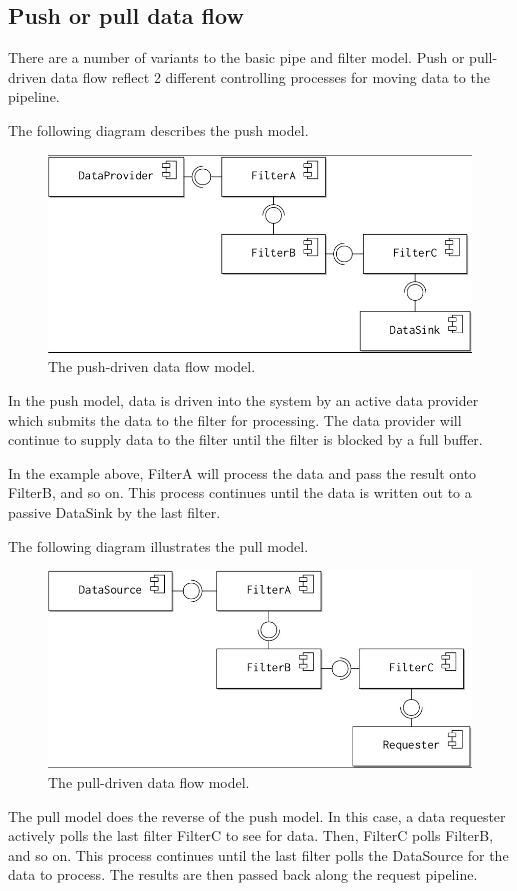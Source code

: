 \documentclass[a4paper, openany]{memoir}
\begin{document}
\subsection{Push or pull data flow}
There are a number of variants to the basic pipe and filter model. Push or pull-driven data flow reflect 2 different controlling processes for moving data to the pipeline. 

The following diagram describes the push model.
\begin{figure}[H]
    \centering
    \includegraphics[scale=0.45]{src/14.13 push.png}
    \caption{The push-driven data flow model.}
\end{figure}
\noindent In the push model, data is driven into the system by an active data provider which submits the data to the filter for processing. The data provider will continue to supply data to the filter until the filter is blocked by a full buffer.

In the example above, FilterA will process the data and pass the result onto FilterB, and so on. This process continues until the data is written out to a passive DataSink by the last filter.

The following diagram illustrates the pull model.
\begin{figure}[H]
    \centering
    \includegraphics[scale=0.45]{src/14.14 pull.png}
    \caption{The pull-driven data flow model.}
\end{figure}
\noindent The pull model does the reverse of the push model. In this case, a data requester actively polls the last filter FilterC to see for data. Then, FilterC polls FilterB, and so on. This process continues until the last filter polls the DataSource for the data to process. The results are then passed back along the request pipeline. 
\end{document}
